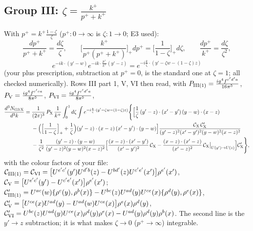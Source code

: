 \documentclass[10pt]{article}
\numberwithin{equation}{section}
\begin{document}
\subsection{Group III: $\zeta=\frac{k^+}{p^++k^+}$}
With $p^+=k^+\frac{1-\zeta}{\zeta}$ ($p^+:0\to\infty$ is $\zeta:1\to0$; E3 used):
\begin{equation}
\frac{dp^+}{p^++k^+}=\frac{d\zeta}{\zeta},\qquad\Big[\frac{k^+}{p^+(p^++k^+)}\Big]_+dp^+=\Big[\frac{1}{1-\zeta}\Big]_+d\zeta,\qquad\frac{dp^+}{k^+}=\frac{d\zeta}{\zeta^2},\end{equation}\begin{equation}e^{-ik\cdot(y'-w)}e^{-ik\cdot\frac{p^+}{k^+}(y'-z)}=e^{-i\frac{k}{\zeta}\cdot\left(y'-\zeta w-(1-\zeta)z\right)}
\end{equation}
(your plus prescription, subtraction at $p^+=0$, is the standard one at $\zeta=1$; all checked numerically). Rows III part 1, V, VI then read, with $P_{\rm III(1)}=\frac{ig^4f^{c'd'a}}{16\pi^5}$, $P_{\rm V}=\frac{ig^4f^{c'ca}}{8\pi^5}$, $P_{\rm VI}=\frac{ig^4f^{c'd'a}}{8\pi^5}$,
\begin{align}
\frac{d^3N_{\rm G3\,X}}{d^3k}={}&\frac{1}{(2\pi)^3}\,P_{\rm X}\,\frac{1}{k^+}\int_0^1d\zeta\int e^{-i\frac{k}{\zeta}\cdot(y'-\zeta w-(1-\zeta)z)}\Bigg\{\Big[\frac1\zeta\,(y'-z)\cdot(x'-y')\,(y-w)\cdot(x-z)\notag\\
&-\Big(\Big[\frac{1}{1-\zeta}\Big]_++\frac1\zeta\Big)(y'-z)\cdot(x-z)\,(x'-y')\cdot(y-w)\Big]\frac{\mathcal C_{\rm X}\,\mathcal C'_{\rm X}}{(y'-z)^{2}(x'-y')^{2}(y-w)^{2}(x-z)^{2}}\notag\\
&-\frac{1}{\zeta^2}\,\frac{(y'-z)\cdot(y-w)}{(y'-z)^{2}(y-w)^{2}(x-z)^{2}}\Big[\frac{(x-z)\cdot(x'-y')}{(x'-y')^2}\,\mathcal C_{\rm X}-\frac{(x-z)\cdot(x'-z)}{(x'-z)^2}\,\mathcal C_{\rm X}\big|_{U(y')\to U(z)}\Big]\mathcal C'_{\rm X}\Bigg\},\label{LT:eq:G3}
\end{align}
with the colour factors of your file: $\mathcal C_{\rm III(1)}=\mathcal C_{\rm VI}=\big[U^{e'c'}(y')U^{d'b}(z)-U^{bd'}(z)U^{c'e'}(x')\big]\rho^{e'}(x')$, $\mathcal C_{\rm V}=\big[U^{e'c'}(y')-U^{c'e'}(x')\big]\rho^{e'}(x')$; $\mathcal C'_{\rm III(1)}=U^{ac}(w)\{\rho^c(y),\rho^b(x)\}-U^{bc}(z)U^{ad}(y)U^{ce}(x)\{\rho^d(y),\rho^e(x)\}$, $\mathcal C'_{\rm V}=\big[U^{ce}(x)U^{ad}(y)-U^{ad}(w)U^{ce}(x)\big]\rho^e(x)\rho^d(y)$, $\mathcal C'_{\rm VI}=U^{bc}(z)U^{ad}(y)U^{ce}(x)\rho^d(y)\rho^e(x)-U^{ad}(y)\rho^d(y)\rho^b(x)$. The second line is the $y'\to z$ subtraction; it is what makes $\zeta\to0$ ($p^+\to\infty$) integrable.
\end{document}
